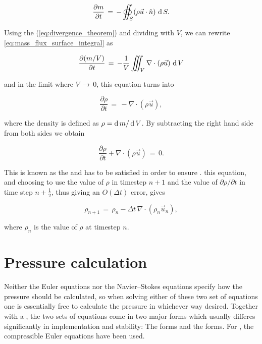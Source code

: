 \begin{equation} \label{eq:mass_flux_surface_integral}
\frac{\partial m}{\partial t} \,=\, -\oiint_S(\rho\vec{u}\cdot\hat{n})\,\operatorname{d} S.
\end{equation}

Using the  (\eqref{eq:divergence_theorem}) and dividing with $V$, we can rewrite \eqref{eq:mass_flux_surface_integral} as

\begin{equation} \label{eq:mass_flux_volume_integral}
\frac{\partial (m/V)}{\partial t} \,=\, -\frac{1}{V}\iiint_V\nabla\cdot(\rho\vec{u})\,\operatorname{d} V
\end{equation}

and in the limit where $V \,\rightarrow\, 0$, this equation turns into

\begin{equation} \label{eq:density_partial_time_derivative}
\frac{\partial \rho}{\partial t} \,=\, -\nabla\cdot(\rho\vec{u}),
\end{equation}

where the density is defined as $\rho = \operatorname{d} m/\operatorname{d} V$. By subtracting the right hand side from both sides we obtain

\begin{equation} \label{eq:continuity_equation}
\frac{\partial \rho}{\partial t} + \nabla\cdot(\rho\vec{u}) \,=\, 0.
\end{equation}

This is known as the  and has to be satisfied in order to ensure .  this equation, and choosing to use the value of $\rho$ in timestep $n+1$ and the value of $\partial \rho/\partial t$ in time step $n+\frac{1}{2}$, thus giving an $O(\Delta t)$ error, gives

\begin{equation} \label{eq:continuity_equation_time_discretized}
\rho_{n+1} \,=\, \rho_{n} - \Delta t\,\nabla\cdot(\rho_{n}\vec{u}_{n}),
\end{equation}

where $\rho_{n}$ is the value of $\rho$ at timestep $n$.

\section{Pressure calculation}

Neither the Euler equations nor the Navier--Stokes equations specify how the pressure should be calculated, so when solving either of these two set of equations one is essentially free to calculate the pressure in whichever way desired. Together with a , the two sets of equations come in two major forms which usually differes significantly in implementation and stability: The \compressible forms and the \incompressible forms. For \thiswork, the compressible Euler equations have been used. %

